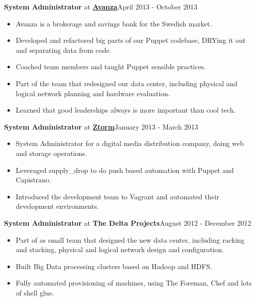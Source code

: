 \documentclass[8pt,sans]{article}
\newenvironment{outerlist}[1][\enskip\textbullet]%
        {\begin{itemize}[#1]}{\end{itemize}%
         \vspace{-.6\baselineskip}}
\newcommand{\blankline}{\quad\pagebreak[2]}
\begin{document}
\textbf{System Administrator} at \href{http://www.avanza.se}{\textbf{Avanza}}\hfill {April 2013 - October 2013}
\begin{outerlist}
\item[] Avanza is a brokerage and savings bank for the Swedish market.

	\item Developed and refactored big parts of our Puppet codebase, DRYing it out and separating data from code.
	\item Coached team members and taught Puppet sensible practices.
	\item Part of the team that redesigned our data center, including physical and logical network planning and hardware evaluation.
	\item Learned that good leaderships always is more important than cool tech.

\end{outerlist}
\blankline

\textbf{System Administrator} at \href{http://www.ztorm.com}{\textbf{Ztorm}}\hfill {January 2013 - March 2013}
\begin{outerlist}
\item[] System Administrator for a digital media distribution company, doing web and storage operations. 

	\item Leveraged supply\_drop to do push based automation with Puppet and Capistrano.
	\item Introduced the development team to Vagrant and automated their development environments.
\end{outerlist}
\blankline

\textbf{System Administrator} at {\textbf{The Delta Projects}}\hfill {August 2012 - December 2012}
\begin{outerlist}
	\item Part of as small team that designed the new data center, including racking and stacking, physical and logical network design and configuration.
	\item Built Big Data processing clusters based on Hadoop and HDFS\@.
	\item Fully automated provisioning of machines, using The Foreman, Chef and lots of shell glue.
\end{outerlist}
\blankline
\end{document}
